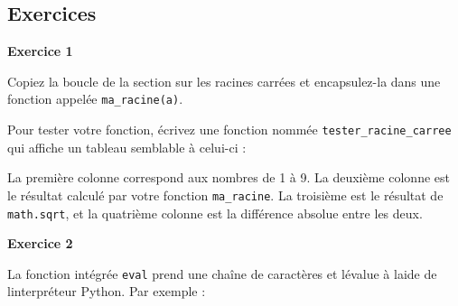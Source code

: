 \hypertarget{exercices}{%
\subsection{Exercices}\label{exercices}}

\textbf{Exercice 1}

Copiez la boucle de la section sur les racines carrées et encapsulez-la
dans une fonction appelée \texttt{ma\_racine(a)}.

Pour tester votre fonction, écrivez une fonction nommée
\texttt{tester\_racine\_carree} qui affiche un tableau semblable à
celui-ci :

\begin{Shaded}
\begin{Highlighting}[]
\NormalTok{{-}   {-}{-}{-}{-}{-}{-}{-}{-}{-}{-}{-}{-}      {-}{-}{-}{-}{-}{-}{-}{-}{-}{-}{-}{-}   {-}{-}{-}{-}}
\end{Highlighting}
\end{Shaded}

La première colonne correspond aux nombres de 1 à 9. La deuxième colonne
est le résultat calculé par votre fonction \texttt{ma\_racine}. La
troisième est le résultat de \texttt{math.sqrt}, et la quatrième colonne
est la différence absolue entre les deux.

\textbf{Exercice 2}

La fonction intégrée \texttt{eval} prend une chaîne de caractères et
l\textquotesingle évalue à l\textquotesingle aide de
l\textquotesingle interpréteur Python. Par exemple :

\begin{Shaded}
\begin{Highlighting}[]
\OperatorTok{\textgreater{}\textgreater{}\textgreater{}} \NormalTok{(}\NormalTok{)}
\OperatorTok{\textgreater{}\textgreater{}\textgreater{}} 
\OperatorTok{\textgreater{}\textgreater{}\textgreater{}} \NormalTok{(}\NormalTok{)}
\OperatorTok{\textgreater{}\textgreater{}\textgreater{}} \NormalTok{(}\NormalTok{)}
\OperatorTok{\textless{}} \OperatorTok{\textgreater{}}
\end{Highlighting}
\end{Shaded}


